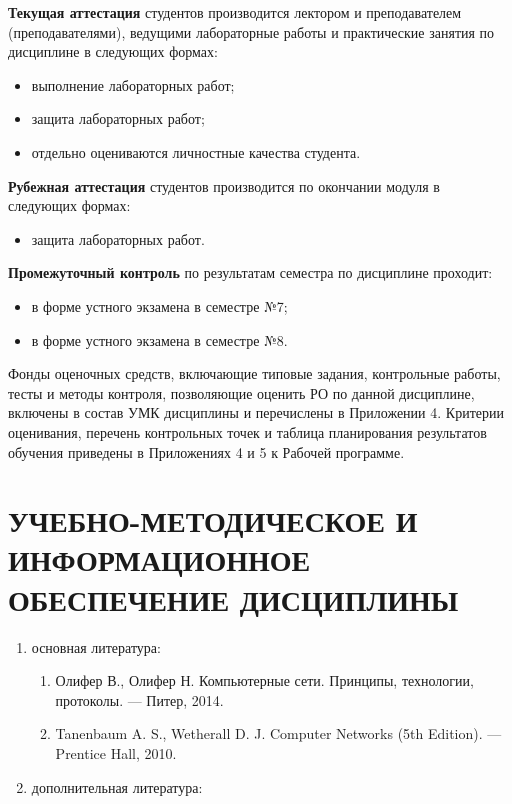 \begin{center}
\textbf{Текущая аттестация} студентов производится лектором и преподавателем (преподавателями), ведущими лабораторные работы и практические занятия по дисциплине в следующих формах:
\begin{itemize}


\item выполнение лабораторных работ;
\item защита лабораторных работ;
\item отдельно оцениваются личностные качества студента.
\end{itemize}

\textbf{Рубежная аттестация} студентов производится по окончании модуля в следующих формах:
\begin{itemize}
\item защита лабораторных работ.
\end{itemize}

\textbf{Промежуточный контроль} по результатам семестра по дисциплине проходит:
\begin{itemize}
\item в форме устного экзамена в семестре №7;\item в форме устного экзамена в семестре №8.
\end{itemize}

Фонды оценочных средств, включающие типовые задания, контрольные работы, тесты и методы контроля, позволяющие оценить РО по данной дисциплине, включены в состав УМК дисциплины и перечислены в Приложении 4.
Критерии оценивания, перечень контрольных точек и таблица планирования результатов обучения приведены в Приложениях 4 и 5 к Рабочей программе.

\newpage
\section{УЧЕБНО-МЕТОДИЧЕСКОЕ И ИНФОРМАЦИОННОЕ ОБЕСПЕЧЕНИЕ ДИСЦИПЛИНЫ}

\begin{enumerate}
\item основная литература:
\begin{enumerate}
\item \label{olifer} Олифер В., Олифер Н. Компьютерные сети. Принципы, технологии, протоколы. — Питер, 2014. \item \label{tanenbaum-eng} Tanenbaum A. S., Wetherall D. J. Computer Networks (5th Edition). — Prentice Hall, 2010.
\end{enumerate}
 \item дополнительная литература:


\end{enumerate}
\end{center}
